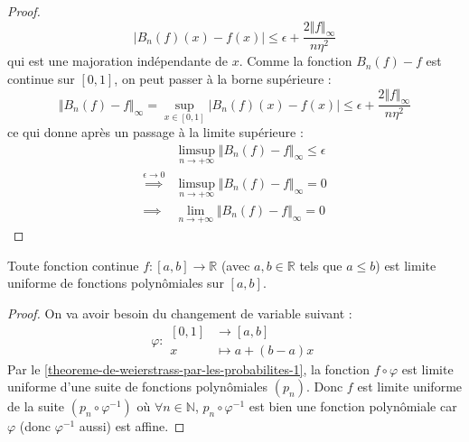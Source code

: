 \begin{proof}
		\[ |B_n(f)(x) - f(x)| \leq \epsilon + \frac{2 \Vert f \Vert_\infty}{n \eta^2} \]
		qui est une majoration indépendante de $x$. Comme la fonction $B_n(f) - f$ est continue sur $[0, 1]$, on peut passer à la borne supérieure :
		\[ \Vert B_n(f) - f \Vert_\infty = \sup_{x \in [0, 1]} |B_n(f)(x) - f(x)| \leq \epsilon + \frac{2 \Vert f \Vert_\infty}{n \eta^2} \]
		ce qui donne après un passage à la limite supérieure :
		\begin{align*}
			&\limsup_{n \rightarrow +\infty} \Vert B_n(f) - f \Vert_\infty \leq \epsilon \\
			\overset{\epsilon \longrightarrow 0}{\implies} &\limsup_{n \rightarrow +\infty} \Vert B_n(f) - f \Vert_\infty = 0 \\
			\implies &\lim_{n \rightarrow +\infty} \Vert B_n(f) - f \Vert_\infty = 0
		\end{align*}
	\end{proof}

	\begin{theorem}[Weierstrass]
		Toute fonction continue $f : [a,b] \rightarrow \mathbb{R}$ (avec $a, b \in \mathbb{R}$ tels que $a \leq b$) est limite uniforme de fonctions polynômiales sur $[a, b]$.
	\end{theorem}

	\begin{proof}
		On va avoir besoin du changement de variable suivant :
		\[ \varphi :
		\begin{array}{cl}
			[0,1] &\rightarrow [a, b] \\
			x &\mapsto a + (b-a) x
		\end{array}
		\]
		Par le \cref{theoreme-de-weierstrass-par-les-probabilites-1}, la fonction $f \circ \varphi$ est limite uniforme d'une suite de fonctions polynômiales $(p_n)$. Donc $f$ est limite uniforme de la suite $(p_n \circ \varphi^{-1})$ où $\forall n \in \mathbb{N}$, $p_n \circ \varphi^{-1}$ est bien une fonction polynômiale car $\varphi$ (donc $\varphi^{-1}$ aussi) est affine.
	\end{proof}

